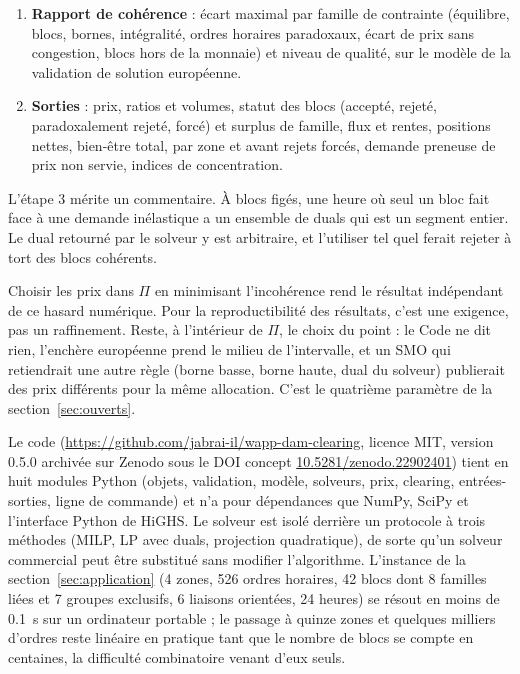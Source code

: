 \documentclass[a4paper,12pt]{article}
\theoremstyle{definition}
\begin{document}
\begin{enumerate}
\item \textbf{Rapport de cohérence} : écart maximal par famille de contrainte (équilibre, blocs, bornes, intégralité, ordres horaires paradoxaux, écart de prix sans congestion, blocs hors de la monnaie) et niveau de qualité, sur le modèle de la validation de solution européenne.
\item \textbf{Sorties} : prix, ratios et volumes, statut des blocs (accepté, rejeté, paradoxalement rejeté, forcé) et surplus de famille, flux et rentes, positions nettes, bien-être total, par zone et avant rejets forcés, demande preneuse de prix non servie, indices de concentration.
\end{enumerate}

L'étape 3 mérite un commentaire. À blocs figés, une heure où seul un bloc fait face à une demande inélastique a un ensemble de duals qui est un segment entier. Le dual retourné par le solveur y est arbitraire, et l'utiliser tel quel ferait rejeter à tort des blocs cohérents.

Choisir les prix dans $\Pi$ en minimisant l'incohérence rend le résultat indépendant de ce hasard numérique. Pour la reproductibilité des résultats, c'est une exigence, pas un raffinement. Reste, à l'intérieur de $\Pi$, le choix du point : le Code ne dit rien, l'enchère européenne prend le milieu de l'intervalle, et un SMO qui retiendrait une autre règle (borne basse, borne haute, dual du solveur) publierait des prix différents pour la même allocation. C'est le quatrième paramètre de la section~\ref{sec:ouverts}.

Le code (\url{https://github.com/jabrai-il/wapp-dam-clearing}, licence MIT, version 0.5.0 archivée sur Zenodo sous le DOI concept \href{https://doi.org/10.5281/zenodo.22902401}{10.5281/zenodo.22902401}) tient en huit modules Python (objets, validation, modèle, solveurs, prix, clearing, entrées-sorties, ligne de commande) et n'a pour dépendances que NumPy, SciPy et l'interface Python de HiGHS. Le solveur est isolé derrière un protocole à trois méthodes (MILP, LP avec duals, projection quadratique), de sorte qu'un solveur commercial peut être substitué sans modifier l'algorithme. L'instance de la section~\ref{sec:application} (4 zones, 526 ordres horaires, 42 blocs dont 8 familles liées et 7 groupes exclusifs, 6 liaisons orientées, 24 heures) se résout en moins de 0.1~s sur un ordinateur portable ; le passage à quinze zones et quelques milliers d'ordres reste linéaire en pratique tant que le nombre de blocs se compte en centaines, la difficulté combinatoire venant d'eux seuls.
\end{document}
